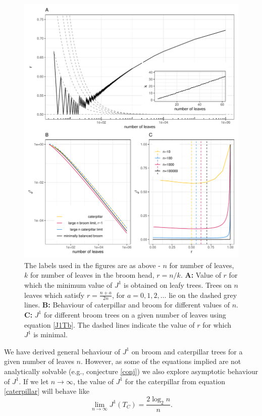     \begin{figure}[h!]
        \begin{center}
        \includegraphics[width = \textwidth]{Chapter_trees/figures/figures_updated.pdf}
        \caption{The labels used in the figures are as above - $n$ for number of leaves, $k$ for number of leaves in the broom head, $r=n/k$. \textbf{A:} Value of $r$ for which the minimum value of $J^1$ is obtained on leafy trees. Trees on $n$ leaves which satisfy $r = \frac{n+a}{2n}$, for $a=0,1,2,\dots$ lie on the dashed grey lines. \textbf{B:} Behaviour of caterpillar and broom for different values of $n$. \textbf{C:} $J^1$ for different broom trees on a given number of leaves using equation \eqref{J1Tb}. The dashed lines indicate the value of $r$ for which $J^1$ is minimal.}
        \label{Rfigures}
        \end{center}
    \end{figure}

We have derived general behaviour of $J^1$ on broom and caterpillar trees for a given number of leaves $n$. However, as some of the equations implied are not analytically solvable (e.g., conjecture \ref{conj}) we also explore asymptotic behaviour of $J^1$.
If we let $n\to\infty$, the value of $J^1$ for the caterpillar from equation \eqref{caterpillar} will behave like
    \begin{equation}
        \lim_{n\to\infty} J^1(T_C) = \frac{2\log_2n}{n}. \label{caterpillarlim}
\end{equation}

